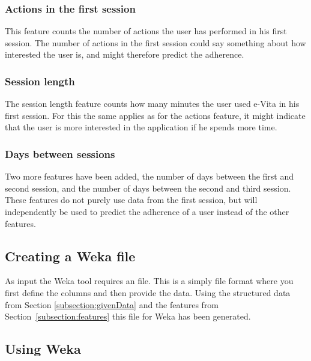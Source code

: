 \subsubsection{Actions in the first session}
This feature counts the number of actions the user has performed in his first session. The number of actions in the first session could say something about how interested the user is, and might therefore predict the adherence.

\subsubsection{Session length}
The session length feature counts how many minutes the user used e-Vita in his first session. For this the same applies as for the actions feature, it might indicate that the user is more interested in the application if he spends more time.

\subsubsection{Days between sessions}
Two more features have been added, the number of days between the first and second session, and the number of days between the second and third session. These features do not purely use data from the first session, but will independently be used to predict the adherence of a user instead of the other features.


\subsection{Creating a Weka file}
As input the Weka tool requires an  file. This is a simply file format where you first define the columns and then provide the data. Using the structured data from Section \ref{subsection:givenData} and the features from Section~\ref{subsection:features} this file for Weka has been generated.

\subsection{Using Weka}


